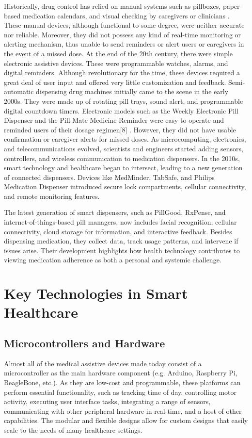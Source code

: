 Historically, drug control has relied on manual systems such as pillboxes, paper-based medication calendars, and visual checking by caregivers or clinicians . These manual devices, although functional to some degree, were neither accurate nor reliable. Moreover, they did not possess any kind of real-time monitoring or alerting mechanism, thus unable to send reminders or alert users or caregivers in the event of a missed dose.
At the end of the 20th century, there were simple electronic assistive devices. These were programmable watches, alarms, and digital reminders. Although revolutionary for the time, these devices required a great deal of user input and offered very little customization and feedback.
Semi-automatic dispensing drug machines initially came to the scene in the early 2000s. They were made up of rotating pill trays, sound alert, and programmable digital countdown timers. Electronic models such as the Weekly Electronic Pill Dispenser and the Pill-Mate Medicine Reminder were easy to operate and reminded users of their dosage regimen[8] . However, they did not have usable confirmation or caregiver alerts for missed doses. As microcomputing, electronics, and telecommunications evolved, scientists and engineers started adding sensors, controllers, and wireless communication to medication dispensers. In the 2010s, smart technology and healthcare began to intersect, leading to a new generation of connected dispensers. Devices like MedMinder, TabSafe, and Philips Medication Dispenser introduced secure lock compartments, cellular connectivity, and remote monitoring features. 

The latest generation of smart dispensers, such as PillGood, RxPense, and internet-of-things-based pill managers, now includes facial recognition, cellular connectivity, cloud storage for information, and interactive feedback. Besides dispensing medication, they collect data, track usage patterns, and intervene if issues arise. Their development highlights how health technology contributes to viewing medication adherence as both a personal and systemic challenge.


\section{ Key Technologies in Smart Healthcare}

\subsection{ Microcontrollers and Hardware}
Almost all of the medical assistive devices made today consist of a microcontroller as the main hardware component (e.g. Arduino, Raspberry Pi, BeagleBone, etc.). As they are low-cost and programmable, these platforms can perform essential functionality, such as tracking time of day, controlling motor activity, executing user interface tasks, integrating a range of sensors, communicating with other peripheral hardware in real-time, and a host of other capabilities.  The modular and flexible designs allow for custom designs that easily scale to the needs of many healthcare settings.

